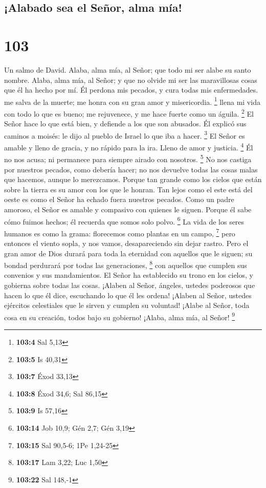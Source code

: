 \hypertarget{alabado-sea-el-seuxf1or-alma-muxeda}{%
\subsection{¡Alabado sea el Señor, alma
mía!}\label{alabado-sea-el-seuxf1or-alma-muxeda}}

\hypertarget{section-102}{%
\section{103}\label{section-102}}

Un salmo de David.  Alaba, alma mía, al Señor; que todo mi
ser alabe su santo nombre.  Alaba, alma mía, al Señor; y que
no olvide mi ser las maravillosas cosas que él ha hecho por mí.
 Él perdona mis pecados, y cura todas mis enfermedades.
 me salva de la muerte; me honra con su gran amor y
misericordia. \footnote{\textbf{103:4} Sal 5,13}  llena mi
vida con todo lo que es bueno; me rejuvenece, y me hace fuerte como un
águila. \footnote{\textbf{103:5} Is 40,31}  El Señor hace lo
que está bien, y defiende a los que son abusados.  Él
explicó sus caminos a moisés: le dijo al pueblo de Israel lo que iba a
hacer. \footnote{\textbf{103:7} Éxod 33,13}  El Señor es
amable y lleno de gracia, y no rápido para la ira. Lleno de amor y
justicia. \footnote{\textbf{103:8} Éxod 34,6; Sal 86,15}  Él
no nos acusa; ni permanece para siempre airado con nosotros. \footnote{\textbf{103:9}
  Is 57,16}  No nos castiga por nuestros pecados, como
debería hacer; no nos devuelve todas las cosas malas que hacemos, aunque
lo merezcamos.  Porque tan grande como los cielos que están
sobre la tierra es su amor con los que le honran.  Tan
lejos como el este está del oeste es como el Señor ha echado fuera
nuestros pecados.  Como un padre amoroso, el Señor es
amable y compasivo con quienes le siguen.  Porque él sabe
cómo fuimos hechos; él recuerda que somos solo polvo. \footnote{\textbf{103:14}
  Job 10,9; Gén 2,7; Gén 3,19}  La vida de los seres
humanos es como la grama: florecemos como plantas en un campo,
\footnote{\textbf{103:15} Sal 90,5-6; 1Pe 1,24-25}  pero
entonces el viento sopla, y nos vamos, desapareciendo sin dejar rastro.
 Pero el gran amor de Dios durará para toda la eternidad
con aquellos que le siguen; su bondad perdurará por todas las
generaciones, \footnote{\textbf{103:17} Lam 3,22; Luc 1,50}
 con aquellos que cumplen sus convenios y sus mandamientos.
 El Señor ha establecido su trono en los cielos, y gobierna
sobre todas las cosas.  ¡Alaben al Señor, ángeles, ustedes
poderosos que hacen lo que él dice, escuchando lo que él les ordena!
 ¡Alaben al Señor, ustedes ejércitos celestiales que le
sirven y cumplen su voluntad!  ¡Alabe al Señor, toda cosa
en su creación, todos bajo su gobierno! ¡Alaba, alma mía, al Señor!
\footnote{\textbf{103:22} Sal 148,-1}

